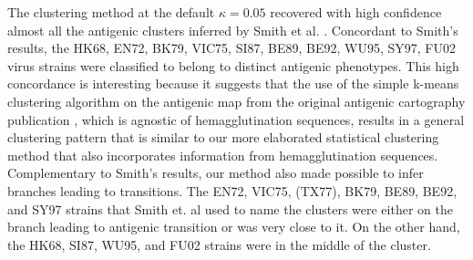 \documentclass[11pt,oneside,letterpaper]{article}
\begin{document}






The clustering method at the default $\kappa=0.05$ recovered with high confidence almost all the  antigenic clusters inferred by Smith et al. \cite{smith_mapping_2004}. 
Concordant to Smith's results, the HK68, EN72, BK79, VIC75, SI87, BE89, BE92, WU95, SY97, FU02 virus strains were classified to belong to distinct antigenic phenotypes. %
This high concordance is interesting because it suggests that the use of the simple k-means clustering algorithm on the antigenic map from the original antigenic cartography publication \cite{smith_mapping_2004}, which is agnostic of hemagglutination sequences, results in a general clustering pattern that is similar to our more elaborated statistical clustering method that also incorporates information from hemagglutination sequences.
Complementary to Smith's results, our method also made possible to infer branches leading to transitions.
The EN72, VIC75, (TX77), BK79, BE89, BE92, and SY97 strains that Smith et. al used to name the clusters were either on the branch leading to antigenic transition or was very close to it.
On the other hand, the HK68, SI87, WU95, and FU02 strains were in the middle of the cluster. 

\end{document}
